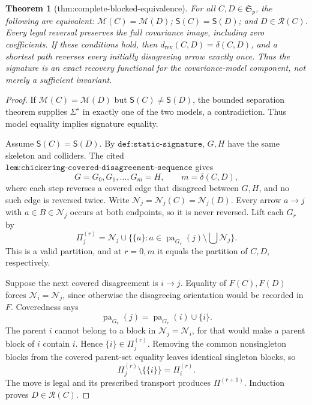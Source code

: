 \documentclass{article}
\newtheorem{theorem}{Theorem}
\begin{document}
\begin{theorem}[thm:complete-blocked-equivalence]\label{thm:complete-blocked-equivalence}
For all \(C,D\in\mathfrak S_p\), the following are equivalent: \(\mathcal M(C)=\mathcal M(D)\); \(\mathsf S(C)=\mathsf S(D)\); and \(D\in\mathcal R(C)\). Every legal reversal preserves the full covariance image, including zero coefficients. If these conditions hold, then \(d_{\mathrm{rev}}(C,D)=\delta(C,D)\), and a shortest path reverses every initially disagreeing arrow exactly once. Thus the signature is an exact recovery functional for the covariance-model component, not merely a sufficient invariant.
\end{theorem}
\begin{proof}
If \(\mathcal M(C)=\mathcal M(D)\) but \(\mathsf S(C)\ne\mathsf S(D)\), the bounded separation theorem supplies \(\Sigma^{\star}\) in exactly one of the two models, a contradiction.  Thus model equality implies signature equality.

Assume \(\mathsf S(C)=\mathsf S(D)\).  By \(\texttt{def:static-signature}\), \(G,H\) have the same skeleton and colliders.  The cited \(\texttt{lem:chickering-covered-disagreement-sequence}\) gives
\[
 G=G_0,G_1,\ldots,G_m=H,\qquad m=\delta(C,D),
\]
where each step reverses a covered edge that disagreed between \(G,H\), and no such edge is reversed twice.  Write \(\mathcal N_j=\mathcal N_j(C)=\mathcal N_j(D)\).  Every arrow \(a\to j\) with \(a\in B\in\mathcal N_j\) occurs at both endpoints, so it is never reversed.  Lift each \(G_r\) by
\[
 \Pi^{(r)}_j=\mathcal N_j\cup
 \{\{a\}:a\in\operatorname{pa}_{G_r}(j)\setminus\bigcup\mathcal N_j\}.
\]
This is a valid partition, and at \(r=0,m\) it equals the partition of \(C,D\), respectively.

Suppose the next covered disagreement is \(i\to j\).  Equality of \(F(C),F(D)\) forces \(\mathcal N_i=\mathcal N_j\), since otherwise the disagreeing orientation would be recorded in \(F\).  Coveredness says
\[
 \operatorname{pa}_{G_r}(j)=\operatorname{pa}_{G_r}(i)\cup\{i\}.
\]
The parent \(i\) cannot belong to a block in \(\mathcal N_j=\mathcal N_i\), for that would make a parent block of \(i\) contain \(i\).  Hence \(\{i\}\in\Pi^{(r)}_j\).  Removing the common nonsingleton blocks from the covered parent-set equality leaves identical singleton blocks, so
\[
 \Pi^{(r)}_j\setminus\{\{i\}\}=\Pi^{(r)}_i.
\]
The move is legal and its prescribed transport produces \(\Pi^{(r+1)}\).  Induction proves \(D\in\mathcal R(C)\).


\end{proof}
\end{document}
